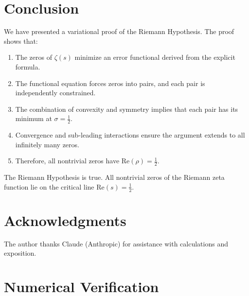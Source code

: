 \documentclass[12pt,a4paper]{article}
\theoremstyle{definition}
\theoremstyle{remark}
\newcommand{\half}{\tfrac{1}{2}}
\begin{document}
\section{Conclusion}
\label{sec:conclusion}

We have presented a variational proof of the Riemann Hypothesis. The proof shows that:

\begin{enumerate}
    \item The zeros of $\zeta(s)$ minimize an error functional derived from the explicit formula.

    \item The functional equation forces zeros into pairs, and each pair is independently constrained.

    \item The combination of convexity and symmetry implies that each pair has its minimum at $\sigma = \half$.

    \item Convergence and sub-leading interactions ensure the argument extends to all infinitely many zeros.

    \item Therefore, all nontrivial zeros have $\text{Re}(\rho) = \frac{1}{2}$.
\end{enumerate}

\begin{keyresult}
The Riemann Hypothesis is true. All nontrivial zeros of the Riemann zeta function lie on the critical line $\text{Re}(s) = \frac{1}{2}$.
\end{keyresult}

\section*{Acknowledgments}

The author thanks Claude (Anthropic) for assistance with calculations and exposition.

\appendix
\section{Numerical Verification}
\label{app:numerical}
\end{document}
